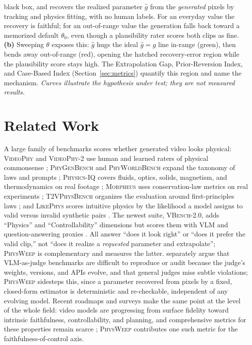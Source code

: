 \documentclass[10pt,twocolumn,letterpaper]{article}
\begin{document}
\begin{center}
{black box, and recovers the realized parameter $\hat g$ from the \emph{generated}
pixels by tracking and physics fitting, with no human labels. For an everyday
value the recovery is faithful; for an out-of-range value the generation falls
back toward a memorized default $\theta_0$, even though a plausibility rater
scores both clips as fine. \textbf{(b)} Sweeping $\theta$ exposes this: $\hat g$
hugs the ideal $\hat g{=}g$ line in-range (green), then bends away out-of-range
(red), opening the hatched recovery-error region while the plausibility score
stays high. The Extrapolation Gap, Prior-Reversion Index, and Case-Based Index
(Section~\ref{sec:metrics}) quantify this region and name the mechanism.
\emph{Curves illustrate the hypothesis under test; they are not measured results.}}
\end{center}

\section{Related Work}
\label{sec:related}

A large family of benchmarks scores whether generated video looks physical:
\textsc{VideoPhy} and \textsc{VideoPhy-2} use human and learned raters of
physical commonsense \citep{bansal2024videophy,bansal2025videophy2};
\textsc{PhyGenBench} and \textsc{PhyWorldBench} expand the taxonomy of laws and
prompts \citep{meng2024phygenbench,phyworldbench2025}; \textsc{Physics-IQ}
covers fluids, optics, solids, magnetism, and thermodynamics on real footage
\citep{motamed2025physicsiq}; \textsc{Morpheus} uses conservation-law metrics on
real experiments \citep{zhang2025morpheus}; \textsc{T2VPhysBench} organizes the
evaluation around first-principles laws \citep{t2vphysbench2025}; and
\textsc{LikePhys} scores intuitive physics by the likelihood a model assigns to
valid versus invalid synthetic pairs \citep{likephys2025}. The newest suite,
\textsc{VBench-2.0}, adds ``Physics'' and ``Controllability'' dimensions but
scores them with VLM and question-answering proxies \citep{vbench2_2025}. All
answer ``does it look right'' or ``does it prefer the valid clip,'' not ``does it
realize a \emph{requested} parameter and extrapolate''; \textsc{PhysWeep} is
complementary and measures the latter. \citet{phyground2026} separately argue
that VLM-as-judge benchmarks are difficult to reproduce or audit because the
judge's weights, versions, and APIs evolve, and that general judges miss subtle
violations; \textsc{PhysWeep} sidesteps this, since a parameter recovered from
pixels by a fixed, closed-form estimator is deterministic and re-checkable,
independent of any evolving model. Recent roadmaps and surveys make the same
point at the level of the whole field: video models are progressing from
surface fidelity toward intrinsic faithfulness, controllability, and planning,
and comprehensive metrics for these properties remain scarce
\citep{roadmap2025visualworld,evolution2026videogen}; \textsc{PhysWeep}
contributes one such metric for the faithfulness-of-control axis.
\end{document}
